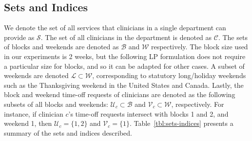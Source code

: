\subsection{Sets and Indices}\label{sec:meth-sets-indices}
We denote the set of all services %
that clinicians in a single department can provide as $\mathcal{S}$. 
The set of all clinicians in the department is denoted as
$\mathcal{C}$. The sets of blocks and weekends
are denoted as $\mathcal{B}$ and $\mathcal{W}$ respectively. The block size
used in our experiments is 2 weeks, but the following LP formulation does not
require a particular size for blocks, and so it can be adapted for other cases.
A subset of weekends are denoted $\mathcal{L} \subset \mathcal{W}$, corresponding to statutory
long/holiday weekends such as the Thanksgiving weekend in the United States and Canada. Lastly,
the block and weekend time-off requests of clinicians are denoted as the following
subsets of all blocks and weekends: $\mathcal{U}_c \subset \mathcal{B}$ and $\mathcal{V}_c \subset \mathcal{W}$, respectively.
For instance, if clinician $c$'s time-off requests intersect with blocks 1 and 2, and weekend
1, then $\mathcal{U}_c = \{1, 2\}$ and $\mathcal{V}_c = \{1\}$. Table~\ref{tbl:sets-indices} presents a summary of the sets and indices described. 

